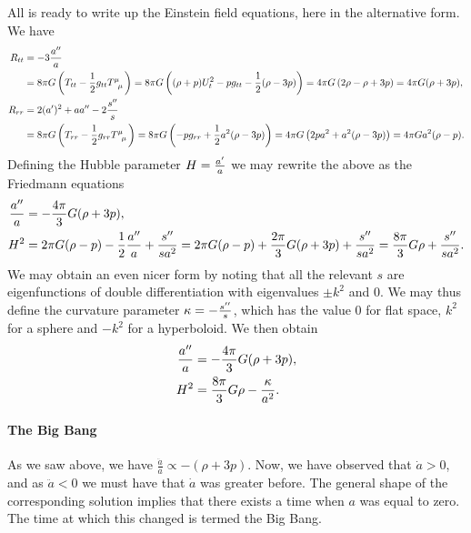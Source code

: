 All is ready to write up the Einstein field equations, here in the alternative form. We have
\begin{align*}
	R_{tt} &= -3\frac{a\pp}{a} \\
	       &= 8\pi G\left(T_{tt} - \frac{1}{2}g_{tt}\tensor{T}{^{\mu}_{\mu}}\right) = 8\pi G\left((\rho + p)U_{t}^{2} - pg_{tt} - \frac{1}{2}(\rho - 3p)\right) = 4\pi G\left(2\rho - \rho + 3p\right) = 4\pi G(\rho + 3p), \\
	R_{rr} &= 2(a\p)^{2} + aa\pp - 2\frac{s\pp}{s} \\
	       &= 8\pi G\left(T_{rr} - \frac{1}{2}g_{rr}\tensor{T}{^{\mu}_{\mu}}\right) = 8\pi G\left(-pg_{rr} + \frac{1}{2}a^{2}(\rho - 3p)\right) = 4\pi G\left(2pa^{2} + a^{2}(\rho - 3p)\right) = 4\pi Ga^{2}(\rho - p).
\end{align*}
Defining the Hubble parameter $H = \frac{a^{\prime}}{a}$ we may rewrite the above as the Friedmann equations
\begin{align*}
	\frac{a^{\prime\prime}}{a} &= -\frac{4\pi}{3}G(\rho + 3p), \\
	H^{2}          &= 2\pi G(\rho - p) - \frac{1}{2}\frac{a^{\prime\prime}}{a} + \frac{s^{\prime\prime}}{sa^{2}} = 2\pi G(\rho - p) + \frac{2\pi}{3}G(\rho + 3p) + \frac{s^{\prime\prime}}{sa^{2}} = \frac{8\pi}{3}G\rho + \frac{s^{\prime\prime}}{sa^{2}}.
\end{align*}
We may obtain an even nicer form by noting that all the relevant $s$ are eigenfunctions of double differentiation with eigenvalues $\pm k^{2}$ and $0$. We may thus define the curvature parameter $\kappa = -\frac{s^{\prime\prime}}{s}$, which has the value $0$ for flat space, $k^{2}$ for a sphere and $-k^{2}$ for a hyperboloid. We then obtain
\begin{align*}
	\frac{a^{\prime\prime}}{a} &= -\frac{4\pi}{3}G(\rho + 3p), \\
	H^{2}          &= \frac{8\pi}{3}G\rho - \frac{\kappa}{a^{2}}.
\end{align*}

\paragraph{The Big Bang}
As we saw above, we have $\frac{\ddot{a}}{a} \propto -(\rho + 3p)$. Now, we have observed that $\dot{a} > 0$, and as $\ddot{a} < 0$ we must have that $\dot{a}$ was greater before. The general shape of the corresponding solution implies that there exists a time when $a$ was equal to zero. The time at which this changed is termed the Big Bang.

